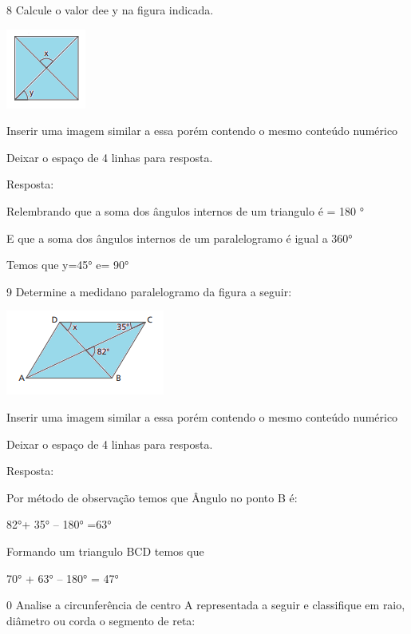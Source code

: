 \num{8} Calcule o valor de\times e y na figura indicada.

\includegraphics[width=1\times 03125in,height=1\times 03125in]{./imgSAEB_8_MAT/media/image10.png}

Inserir uma imagem similar a essa porém contendo o mesmo conteúdo
numérico

Deixar o espaço de 4 linhas para resposta.

Resposta:

Relembrando que a soma dos ângulos internos de um triangulo é = 180 °

E que a soma dos ângulos internos de um paralelogramo é igual a 360°

Temos que y=45° e\times = 90°

\num{9} Determine a medida\times no paralelogramo da figura a seguir:

\includegraphics[width=2\times 05208in,height=1\times 09375in]{./imgSAEB_8_MAT/media/image11.png}

Inserir uma imagem similar a essa porém contendo o mesmo conteúdo
numérico

Deixar o espaço de 4 linhas para resposta.

Resposta:

Por método de observação temos que Ângulo no ponto B é:

82°+ 35° -- 180° =63°

Formando um triangulo BCD temos que

70° + 63° -- 180° = 47°

\num{0} Analise a circunferência de centro A representada a seguir e
classifique em raio, diâmetro ou corda o segmento de reta:

